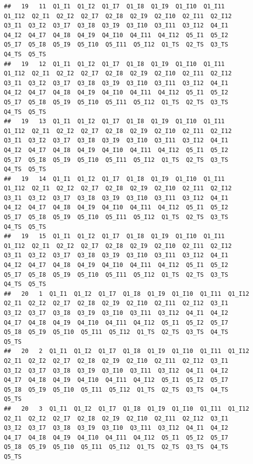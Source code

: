 \documentclass[
]{book}
\begin{document}
\begin{verbatim}
##   19   11  Q1_I1  Q1_I2  Q1_I7  Q1_I8  Q1_I9  Q1_I10  Q1_I11  Q1_I12  Q2_I1  Q2_I2  Q2_I7  Q2_I8  Q2_I9  Q2_I10  Q2_I11  Q2_I12  Q3_I1  Q3_I2  Q3_I7  Q3_I8  Q3_I9  Q3_I10  Q3_I11  Q3_I12  Q4_I1  Q4_I2  Q4_I7  Q4_I8  Q4_I9  Q4_I10  Q4_I11  Q4_I12  Q5_I1  Q5_I2  Q5_I7  Q5_I8  Q5_I9  Q5_I10  Q5_I11  Q5_I12  Q1_TS  Q2_TS  Q3_TS  Q4_TS  Q5_TS
##   19   12  Q1_I1  Q1_I2  Q1_I7  Q1_I8  Q1_I9  Q1_I10  Q1_I11  Q1_I12  Q2_I1  Q2_I2  Q2_I7  Q2_I8  Q2_I9  Q2_I10  Q2_I11  Q2_I12  Q3_I1  Q3_I2  Q3_I7  Q3_I8  Q3_I9  Q3_I10  Q3_I11  Q3_I12  Q4_I1  Q4_I2  Q4_I7  Q4_I8  Q4_I9  Q4_I10  Q4_I11  Q4_I12  Q5_I1  Q5_I2  Q5_I7  Q5_I8  Q5_I9  Q5_I10  Q5_I11  Q5_I12  Q1_TS  Q2_TS  Q3_TS  Q4_TS  Q5_TS
##   19   13  Q1_I1  Q1_I2  Q1_I7  Q1_I8  Q1_I9  Q1_I10  Q1_I11  Q1_I12  Q2_I1  Q2_I2  Q2_I7  Q2_I8  Q2_I9  Q2_I10  Q2_I11  Q2_I12  Q3_I1  Q3_I2  Q3_I7  Q3_I8  Q3_I9  Q3_I10  Q3_I11  Q3_I12  Q4_I1  Q4_I2  Q4_I7  Q4_I8  Q4_I9  Q4_I10  Q4_I11  Q4_I12  Q5_I1  Q5_I2  Q5_I7  Q5_I8  Q5_I9  Q5_I10  Q5_I11  Q5_I12  Q1_TS  Q2_TS  Q3_TS  Q4_TS  Q5_TS
##   19   14  Q1_I1  Q1_I2  Q1_I7  Q1_I8  Q1_I9  Q1_I10  Q1_I11  Q1_I12  Q2_I1  Q2_I2  Q2_I7  Q2_I8  Q2_I9  Q2_I10  Q2_I11  Q2_I12  Q3_I1  Q3_I2  Q3_I7  Q3_I8  Q3_I9  Q3_I10  Q3_I11  Q3_I12  Q4_I1  Q4_I2  Q4_I7  Q4_I8  Q4_I9  Q4_I10  Q4_I11  Q4_I12  Q5_I1  Q5_I2  Q5_I7  Q5_I8  Q5_I9  Q5_I10  Q5_I11  Q5_I12  Q1_TS  Q2_TS  Q3_TS  Q4_TS  Q5_TS
##   19   15  Q1_I1  Q1_I2  Q1_I7  Q1_I8  Q1_I9  Q1_I10  Q1_I11  Q1_I12  Q2_I1  Q2_I2  Q2_I7  Q2_I8  Q2_I9  Q2_I10  Q2_I11  Q2_I12  Q3_I1  Q3_I2  Q3_I7  Q3_I8  Q3_I9  Q3_I10  Q3_I11  Q3_I12  Q4_I1  Q4_I2  Q4_I7  Q4_I8  Q4_I9  Q4_I10  Q4_I11  Q4_I12  Q5_I1  Q5_I2  Q5_I7  Q5_I8  Q5_I9  Q5_I10  Q5_I11  Q5_I12  Q1_TS  Q2_TS  Q3_TS  Q4_TS  Q5_TS
##   20   1  Q1_I1  Q1_I2  Q1_I7  Q1_I8  Q1_I9  Q1_I10  Q1_I11  Q1_I12  Q2_I1  Q2_I2  Q2_I7  Q2_I8  Q2_I9  Q2_I10  Q2_I11  Q2_I12  Q3_I1  Q3_I2  Q3_I7  Q3_I8  Q3_I9  Q3_I10  Q3_I11  Q3_I12  Q4_I1  Q4_I2  Q4_I7  Q4_I8  Q4_I9  Q4_I10  Q4_I11  Q4_I12  Q5_I1  Q5_I2  Q5_I7  Q5_I8  Q5_I9  Q5_I10  Q5_I11  Q5_I12  Q1_TS  Q2_TS  Q3_TS  Q4_TS  Q5_TS
##   20   2  Q1_I1  Q1_I2  Q1_I7  Q1_I8  Q1_I9  Q1_I10  Q1_I11  Q1_I12  Q2_I1  Q2_I2  Q2_I7  Q2_I8  Q2_I9  Q2_I10  Q2_I11  Q2_I12  Q3_I1  Q3_I2  Q3_I7  Q3_I8  Q3_I9  Q3_I10  Q3_I11  Q3_I12  Q4_I1  Q4_I2  Q4_I7  Q4_I8  Q4_I9  Q4_I10  Q4_I11  Q4_I12  Q5_I1  Q5_I2  Q5_I7  Q5_I8  Q5_I9  Q5_I10  Q5_I11  Q5_I12  Q1_TS  Q2_TS  Q3_TS  Q4_TS  Q5_TS
##   20   3  Q1_I1  Q1_I2  Q1_I7  Q1_I8  Q1_I9  Q1_I10  Q1_I11  Q1_I12  Q2_I1  Q2_I2  Q2_I7  Q2_I8  Q2_I9  Q2_I10  Q2_I11  Q2_I12  Q3_I1  Q3_I2  Q3_I7  Q3_I8  Q3_I9  Q3_I10  Q3_I11  Q3_I12  Q4_I1  Q4_I2  Q4_I7  Q4_I8  Q4_I9  Q4_I10  Q4_I11  Q4_I12  Q5_I1  Q5_I2  Q5_I7  Q5_I8  Q5_I9  Q5_I10  Q5_I11  Q5_I12  Q1_TS  Q2_TS  Q3_TS  Q4_TS  Q5_TS

\end{verbatim}
\end{document}
